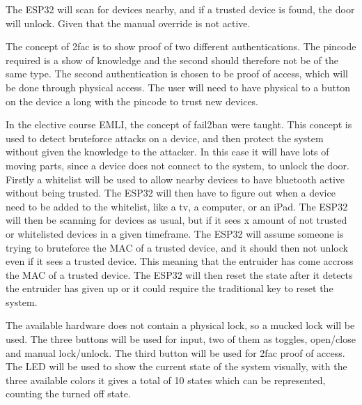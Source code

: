 The ESP32 will scan for devices nearby, and if a trusted device is found, the door will unlock.
Given that the manual override is not active.


The concept of 2fac is to show proof of two different authentications.
The pincode required is a show of knowledge and the second should therefore not be of the same type.
The second authentication is chosen to be proof of access, which will be done through physical access.
The user will need to have physical to a button on the device a long with the pincode to trust new devices.


In the elective course EMLI, the concept of fail2ban were taught.
This concept is used to detect bruteforce attacks on a device, and then protect the system without given the knowledge to the attacker.
In this case it will have lots of moving parts, since a device does not connect to the system, to unlock the door.
Firstly a whitelist will be used to allow nearby devices to have bluetooth active without being trusted.
The ESP32 will then have to figure out when a device need to be added to the whitelist, like a tv, a computer, or an iPad.
The ESP32 will then be scanning for devices as usual, but if it sees x amount of not trusted or whitelisted devices in a given timeframe.
The ESP32 will assume someone is trying to bruteforce the MAC of a trusted device, and it should then not unlock even if it sees a trusted device.
This meaning that the entruider has come accross the MAC of a trusted device.
The ESP32 will then reset the state after it detects the entruider has given up or it could require the traditional key to reset the system.


The available hardware does not contain a physical lock, so a mucked lock will be used.
The three buttons will be used for input, two of them as toggles, open/close and manual lock/unlock.
The third button will be used for 2fac proof of access.
The LED will be used to show the current state of the system visually, with the three available colors it gives a total of 10 states which can be represented, counting the turned off state.